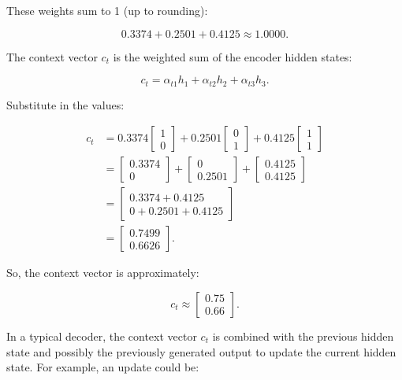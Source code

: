 These weights sum to 1 (up to rounding):

\[
0.3374 + 0.2501 + 0.4125 \approx 1.0000.
\]

The context vector \( c_t \) is the weighted sum of the encoder hidden states:

\[
c_t = \alpha_{t1} h_1 + \alpha_{t2} h_2 + \alpha_{t3} h_3.
\]

Substitute in the values:

\[
\begin{aligned}
c_t &= 0.3374 \begin{bmatrix} 1 \\ 0 \end{bmatrix} 
+ 0.2501 \begin{bmatrix} 0 \\ 1 \end{bmatrix} 
+ 0.4125 \begin{bmatrix} 1 \\ 1 \end{bmatrix} \\
&= \begin{bmatrix} 0.3374 \\ 0 \end{bmatrix} 
+ \begin{bmatrix} 0 \\ 0.2501 \end{bmatrix} 
+ \begin{bmatrix} 0.4125 \\ 0.4125 \end{bmatrix} \\
&= \begin{bmatrix} 0.3374 + 0.4125 \\ 0 + 0.2501 + 0.4125 \end{bmatrix} \\
&= \begin{bmatrix} 0.7499 \\ 0.6626 \end{bmatrix}.
\end{aligned}
\]

So, the context vector is approximately:

\[
c_t \approx \begin{bmatrix} 0.75 \\ 0.66 \end{bmatrix}.
\]

In a typical decoder, the context vector \( c_t \) is combined with the previous hidden state and possibly the previously generated output to update the current hidden state. For example, an update could be:

